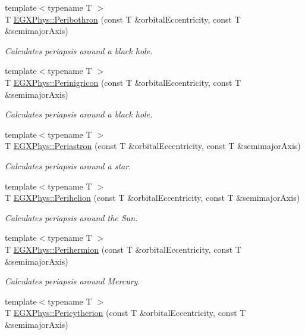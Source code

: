 \begin{DoxyCompactItemize}
{\footnotesize template$<$typename T $>$ }\\T \hyperlink{group___periapsis_gada5892309279a3a687c4eb2f88238e4e}{E\+G\+X\+Phys\+::\+Peribothron} (const T \&orbital\+Eccentricity, const T \&semimajor\+Axis)
\begin{DoxyCompactList}\small\item\em Calculates periapsis around a black hole. \end{DoxyCompactList}\item 
{\footnotesize template$<$typename T $>$ }\\T \hyperlink{group___periapsis_ga99d86af90179994e17158b082c502fd4}{E\+G\+X\+Phys\+::\+Perinigricon} (const T \&orbital\+Eccentricity, const T \&semimajor\+Axis)
\begin{DoxyCompactList}\small\item\em Calculates periapsis around a black hole. \end{DoxyCompactList}\item 
{\footnotesize template$<$typename T $>$ }\\T \hyperlink{group___periapsis_ga477de6824cbb5986cdae923141e21648}{E\+G\+X\+Phys\+::\+Periastron} (const T \&orbital\+Eccentricity, const T \&semimajor\+Axis)
\begin{DoxyCompactList}\small\item\em Calculates periapsis around a star. \end{DoxyCompactList}\item 
{\footnotesize template$<$typename T $>$ }\\T \hyperlink{group___periapsis_ga941d285e3a0b48ada9c9f60925ff63c2}{E\+G\+X\+Phys\+::\+Perihelion} (const T \&orbital\+Eccentricity, const T \&semimajor\+Axis)
\begin{DoxyCompactList}\small\item\em Calculates periapsis around the Sun. \end{DoxyCompactList}\item 
{\footnotesize template$<$typename T $>$ }\\T \hyperlink{group___periapsis_ga9562e9cbfd73019ae9cdaa643b843d63}{E\+G\+X\+Phys\+::\+Perihermion} (const T \&orbital\+Eccentricity, const T \&semimajor\+Axis)
\begin{DoxyCompactList}\small\item\em Calculates periapsis around Mercury. \end{DoxyCompactList}\item 
{\footnotesize template$<$typename T $>$ }\\T \hyperlink{group___periapsis_gaa270e364cbbd7d3d6212872df484926f}{E\+G\+X\+Phys\+::\+Pericytherion} (const T \&orbital\+Eccentricity, const T \&semimajor\+Axis)

\end{DoxyCompactItemize}
